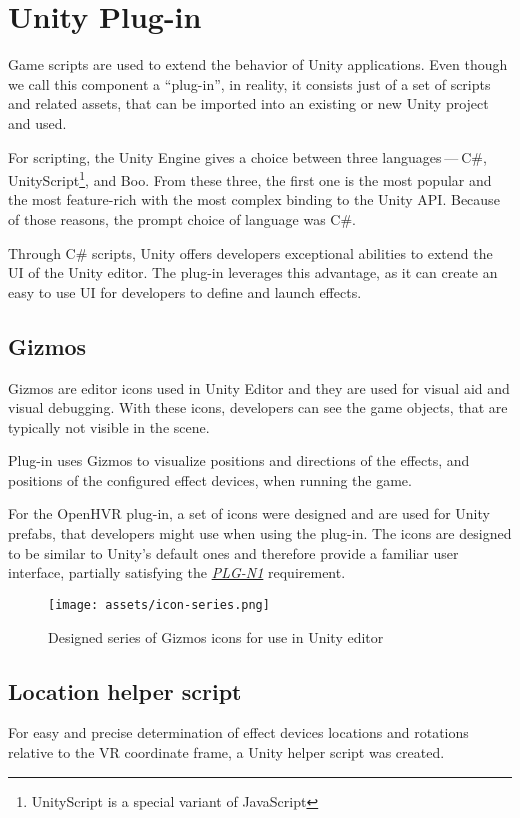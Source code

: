 \hypertarget{x-unity-plug-in}{\section{Unity Plug-in}}
Game scripts are used to extend the behavior of Unity applications. Even though
we call this component a ``plug-in'', in reality, it consists just of a
set of scripts and related assets, that can be imported into an existing
or new Unity project and used.


For scripting, the Unity Engine gives a choice between three languages — C\#, 
UnityScript\footnote{UnityScript is a special variant of JavaScript}, and
Boo. From these three, the first one is the most popular and the most
feature-rich with the most complex binding to the Unity API. \cite{unityblog}
Because of those reasons, the prompt choice of language was C\#.


Through C\# scripts, Unity offers developers exceptional abilities to extend
the UI of the Unity editor. The plug-in leverages this advantage, as it can
create an easy to use UI for developers to define and launch effects.


\hypertarget{x-gizmos}{\subsection{Gizmos}}
Gizmos are editor icons used in Unity Editor and they are used for
visual aid and visual debugging. \cite{gizmos}
With these icons, developers can see the game objects, that are
typically not visible in the scene.


Plug-in uses Gizmos to visualize positions and directions of the
effects, and positions of the configured effect devices, when running the game.


For the OpenHVR plug-in, a set of icons were designed and are used for
Unity prefabs, that developers might use when using the plug-in. The icons
are designed to be similar to Unity’s default ones and therefore provide
a familiar user interface, partially satisfying the 
\hyperlink{plg-n1}{\textit{PLG-N1}} requirement.


\begin{figure}[h]{}
    \vspace{1em}
\centering\texttt{[image: assets/icon-series.png]}
\caption{Designed series of Gizmos icons for use in Unity editor}

\end{figure}

\hypertarget{x-location-helper-script}{\subsection{Location helper script}}
For easy and precise determination of effect devices locations and rotations
relative to the VR coordinate frame, a Unity helper script was created.


